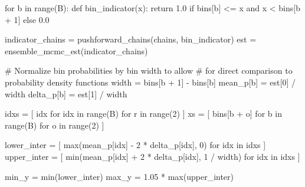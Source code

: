 \documentclass[
  letterpaper,
  DIV=11,
  numbers=noendperiod]{scrartcl}
\newenvironment{Shaded}{\begin{snugshade}}{\end{snugshade}}
\newcommand{\BuiltInTok}[1]{\textcolor[rgb]{0.00,0.23,0.31}{#1}}
\newcommand{\CommentTok}[1]{\textcolor[rgb]{0.37,0.37,0.37}{#1}}
\newcommand{\ControlFlowTok}[1]{\textcolor[rgb]{0.00,0.23,0.31}{#1}}
\newcommand{\DecValTok}[1]{\textcolor[rgb]{0.68,0.00,0.00}{#1}}
\newcommand{\FloatTok}[1]{\textcolor[rgb]{0.68,0.00,0.00}{#1}}
\newcommand{\KeywordTok}[1]{\textcolor[rgb]{0.00,0.23,0.31}{#1}}
\newcommand{\NormalTok}[1]{\textcolor[rgb]{0.00,0.23,0.31}{#1}}
\newcommand{\OperatorTok}[1]{\textcolor[rgb]{0.37,0.37,0.37}{#1}}
\begin{document}
\begin{Shaded}
\begin{Highlighting}[]
  \ControlFlowTok{for}\NormalTok{ b }\KeywordTok{in} \BuiltInTok{range}\NormalTok{(B):}
    \KeywordTok{def}\NormalTok{ bin\_indicator(x):}
      \ControlFlowTok{return} \FloatTok{1.0} \ControlFlowTok{if}\NormalTok{ bins[b] }\OperatorTok{\textless{}=}\NormalTok{ x }\KeywordTok{and}\NormalTok{ x }\OperatorTok{\textless{}}\NormalTok{ bins[b }\OperatorTok{+} \DecValTok{1}\NormalTok{] }\ControlFlowTok{else} \FloatTok{0.0}
    
\NormalTok{    indicator\_chains }\OperatorTok{=}\NormalTok{ pushforward\_chains(chains, bin\_indicator)}
\NormalTok{    est }\OperatorTok{=}\NormalTok{ ensemble\_mcmc\_est(indicator\_chains)}
    
    \CommentTok{\# Normalize bin probabilities by bin width to allow}
    \CommentTok{\# for direct comparison to probability density functions}
\NormalTok{    width }\OperatorTok{=}\NormalTok{ bins[b }\OperatorTok{+} \DecValTok{1}\NormalTok{] }\OperatorTok{{-}}\NormalTok{ bins[b]}
\NormalTok{    mean\_p[b] }\OperatorTok{=}\NormalTok{ est[}\DecValTok{0}\NormalTok{] }\OperatorTok{/}\NormalTok{ width}
\NormalTok{    delta\_p[b] }\OperatorTok{=}\NormalTok{ est[}\DecValTok{1}\NormalTok{] }\OperatorTok{/}\NormalTok{ width}
  
\NormalTok{  idxs }\OperatorTok{=}\NormalTok{ [ idx }\ControlFlowTok{for}\NormalTok{ idx }\KeywordTok{in} \BuiltInTok{range}\NormalTok{(B) }\ControlFlowTok{for}\NormalTok{ r }\KeywordTok{in} \BuiltInTok{range}\NormalTok{(}\DecValTok{2}\NormalTok{) ]}
\NormalTok{  xs }\OperatorTok{=}\NormalTok{ [ bins[b }\OperatorTok{+}\NormalTok{ o] }\ControlFlowTok{for}\NormalTok{ b }\KeywordTok{in} \BuiltInTok{range}\NormalTok{(B) }\ControlFlowTok{for}\NormalTok{ o }\KeywordTok{in} \BuiltInTok{range}\NormalTok{(}\DecValTok{2}\NormalTok{) ]}
  
\NormalTok{  lower\_inter }\OperatorTok{=}\NormalTok{ [ }\BuiltInTok{max}\NormalTok{(mean\_p[idx] }\OperatorTok{{-}} \DecValTok{2} \OperatorTok{*}\NormalTok{ delta\_p[idx], }\DecValTok{0}\NormalTok{)         }\ControlFlowTok{for}\NormalTok{ idx }\KeywordTok{in}\NormalTok{ idxs ]}
\NormalTok{  upper\_inter }\OperatorTok{=}\NormalTok{ [ }\BuiltInTok{min}\NormalTok{(mean\_p[idx] }\OperatorTok{+} \DecValTok{2} \OperatorTok{*}\NormalTok{ delta\_p[idx], }\DecValTok{1} \OperatorTok{/}\NormalTok{ width) }\ControlFlowTok{for}\NormalTok{ idx }\KeywordTok{in}\NormalTok{ idxs ]}
  
\NormalTok{  min\_y }\OperatorTok{=}        \BuiltInTok{min}\NormalTok{(lower\_inter)}
\NormalTok{  max\_y }\OperatorTok{=} \FloatTok{1.05} \OperatorTok{*} \BuiltInTok{max}\NormalTok{(upper\_inter)}
  

\end{Highlighting}
\end{Shaded}
\end{document}
